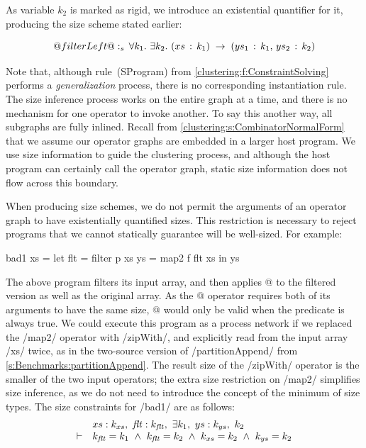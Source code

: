 As variable $k_2$ is marked as rigid, we introduce an existential quantifier for it, producing the size scheme stated earlier:

$$
@filterLeft@ :\sb{s}\,\forall k\sb{1}.\ \exists k\sb{2}.\ (xs\,:\,k\sb{1})\;\to\;(ys\sb{1}\,:\,k\sb{1},\,ys\sb{2}\,:\,k\sb{2})
$$

Note that, although rule~(SProgram) from \cref{clustering:f:ConstraintSolving} performs a \emph{generalization} process, there is no corresponding instantiation rule.
The size inference process works on the entire graph at a time, and there is no mechanism for one operator to invoke another.
To say this another way, all subgraphs are fully inlined.
Recall from \cref{clustering:s:CombinatorNormalForm} that we assume our operator graphs are embedded in a larger host program.
We use size information to guide the clustering process, and although the host program can certainly call the operator graph, static size information does not flow across this boundary.

When producing size schemes, we do not permit the arguments of an operator graph to have existentially quantified sizes.
This restriction is necessary to reject programs that we cannot statically guarantee will be well-sized.
For example:
\begin{haskell}
bad1 xs
 = let flt = filter p xs
       ys  = map2   f flt xs
   in  ys
\end{haskell}

The above program filters its input array, and then applies @ to the filtered version as well as the original array.
As the @ operator requires both of its arguments to have the same size, @ would only be valid when the predicate \Hs@p@ is always true.
We could execute this program as a process network if we replaced the \Hs/map2/ operator with \Hs/zipWith/, and explicitly read from the input array \Hs/xs/ twice, as in the two-source version of \Hs/partitionAppend/ from \cref{s:Benchmarks:partitionAppend}.
The result size of the \Hs/zipWith/ operator is the smaller of the two input operators; the extra size restriction on \Hs/map2/ simplifies size inference, as we do not need to introduce the concept of the minimum of size types.
The size constraints for \Hs/bad1/ are as follows:
$$
\begin{array}{ll}
       & xs : k_{xs},~ \mathit{flt} : k_{\mathit{flt}},~ \exists k_1,~ ys : k_{ys},~ k_2
\\
\vdash &          k_{\mathit{flt}}  = k_1
        ~\wedge~  k_{\mathit{flt}}  = k_2
        ~\wedge~  k_{xs}   = k_2
        ~\wedge~  k_{ys}   = k_2
\end{array}
$$

